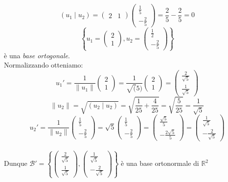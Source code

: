 \documentclass[12pt]{article}
\begin{document}
\[(u_1 \mid u_2) = \begin{pmatrix}
    2 & 1
\end{pmatrix} \begin{pmatrix}
    \frac{1}{5}\\
    -\frac{2}{5}
\end{pmatrix} = \frac{2}{5} - \frac{2}{5} = 0\]
\[\left\{u_1 =  \begin{pmatrix}
    2\\
    1
\end{pmatrix}, u_2 = \begin{pmatrix}
    \frac{1}{2}\\
    -\frac{2}{5}
\end{pmatrix}\right\}\]
è una \textit{base ortogonale}.
\\
Normalizzando otteniamo:
\[u_1' = \frac{1}{\|u_1\|}\begin{pmatrix}
    2\\
    1
\end{pmatrix} = \frac{1}{\sqrt(5)} \begin{pmatrix}
    2\\
    1
\end{pmatrix} = \begin{pmatrix}
    \frac{2}{\sqrt{5}}\\
    \frac{1}{\sqrt{5}}
\end{pmatrix}\]
\[\|u_2\| = \sqrt{(u_2 \mid u_2)} = \sqrt{\frac{1}{25} + \frac{4}{25}} = \sqrt{\frac{5}{25}} = \frac{1}{\sqrt{5}}\]
\[u_2' = \frac{1}{\|u_2\|} \begin{pmatrix}
    \frac{1}{5}\\
    -\frac{2}{5}
\end{pmatrix} =  \sqrt{5} \begin{pmatrix}
    \frac{1}{5}\\
    -\frac{2}{5}
\end{pmatrix} = \begin{pmatrix}
    \frac{\sqrt{5}}{5}\\
    -\frac{2\sqrt{5}}{5}
\end{pmatrix} = \begin{pmatrix}
    \frac{1}{\sqrt{5}}\\
    -\frac{2}{\sqrt{5}}
\end{pmatrix}\]
\\
Dunque $\mathcal{B}' = \left\{\begin{pmatrix}
    \frac{2}{\sqrt{5}}\\
    \frac{1}{\sqrt{5}}
\end{pmatrix}, \begin{pmatrix}
    \frac{1}{\sqrt{5}}\\
    -\frac{2}{\sqrt{5}}
\end{pmatrix}\right\}$ è una base ortonormale di $\mathbb{R}^2$
\end{document}
